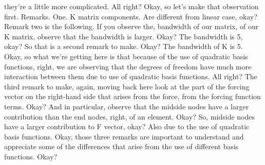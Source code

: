\documentclass[10pt]{article}
\begin{document}
{they're a little more complicated. All right? Okay, so let's make that observation first. Remarks. One. K matrix components. Are different from linear case, okay? Remark two is the following. If you observe the, bandwidth of our matrix, of our K matrix, observe that the bandwidth is larger. Okay? The bandwidth is 5, okay? So that is a second remark to make. Okay? The bandwidth of K is 5. Okay, so what we're getting here is that because of the use of quadratic basis functions, right, we are observing that the degrees of freedom have much more interaction between them due to use of quadratic basis functions. All right? The third remark to make, again, moving back here look at the part of the forcing vector on the right-hand side that arises from the force, from the forcing function terms. Okay? And in particular, observe that the midside nodes have a larger contribution than the end nodes, right, of an element. Okay? So, midside nodes have a larger contribution to F vector, okay? Also due to the use of quadratic basis functions. Okay, those three remarks are important to understand and appreciate some of the differences that arise from the use of different basis functions. Okay?

}
\end{document}
